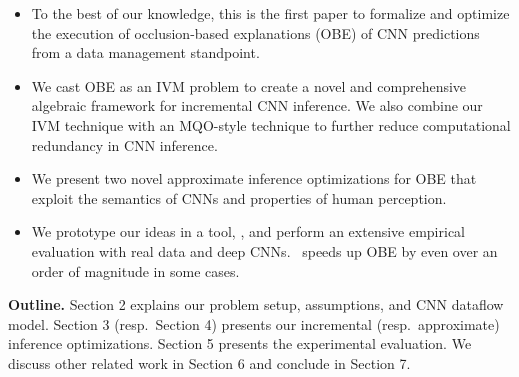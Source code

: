 \begin{itemize}
	\item To the best of our knowledge, this is the first paper to formalize and optimize the execution of occlusion-based explanations (OBE) of CNN predictions from a data management standpoint.

	\item We cast OBE as an IVM problem to create a novel and comprehensive algebraic framework for incremental CNN inference. We also combine our IVM technique with an MQO-style technique to further reduce computational redundancy in CNN inference.

	\item We present two novel approximate inference optimizations for OBE that exploit the semantics of CNNs and properties of human perception.

	\item We prototype our ideas in a tool, \system, and perform an extensive empirical evaluation with real data and deep CNNs. \system ~speeds up OBE by even over an order of magnitude in some cases.

\end{itemize}

\noindent \textbf{Outline.} 
Section 2 explains our problem setup, assumptions, and CNN dataflow model. Section 3 (resp.~Section 4) presents our incremental (resp.~approximate) inference optimizations. Section 5 presents the experimental evaluation. We discuss other related work in Section 6 and conclude in Section 7.
